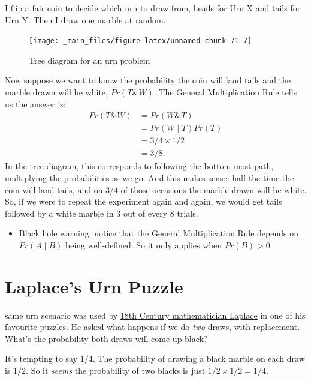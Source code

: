 \documentclass[justified]{tufte-book}
\newcommand{\given}{\mid}
\renewcommand{\wedge}{\mathbin{\&}}
\newcommand{\gt}{>}
\newcommand{\p}{Pr}
\newenvironment{warning}{\begin{itemize}\item[\faBan]}{\end{itemize}}
\theoremstyle{definition}
\theoremstyle{definition}
\theoremstyle{definition}
\theoremstyle{remark}
\begin{document}
I flip a fair coin to decide which urn to draw from, heads for Urn X and
tails for Urn Y. Then I draw one marble at random.

\begin{figure}
\texttt{[image: \_main\_files/figure-latex/unnamed-chunk-71-7]} \caption[Tree diagram for an urn problem]{Tree diagram for an urn problem}\label{fig:unnamed-chunk-71}
\end{figure}

Now suppose we want to know the probability the coin will land tails and
the marble drawn will be white, \(\p(T \wedge W)\). The General
Multiplication Rule tells us the answer is: \[
  \begin{aligned}
    \p(T \wedge W) &= \p(W \wedge T)\\
                   &= \p(W \given T) \p(T)\\
                   &= 3/4 \times 1/2\\
                   &= 3/8.
  \end{aligned}
\] In the tree diagram, this corresponds to following the bottom-most
path, multiplying the probabilities as we go. And this makes sense: half
the time the coin will land tails, and on \(3/4\) of those occasions the
marble drawn will be white. So, if we were to repeat the experiment
again and again, we would get tails followed by a white marble in \(3\)
out of every \(8\) trials.

\begin{warning}
Black hole warning: notice that the General Multiplication Rule depends
on \(\p(A \given B)\) being well-defined. So it only applies when
\(\p(B) \gt 0\).
\end{warning}

\hypertarget{laplaces-urn-puzzle}{%
\section{Laplace's Urn Puzzle}\label{laplaces-urn-puzzle}}

 same urn scenario was used by
\protect\hyperlink{strength}{18th Century mathematician Laplace} in one
of his favourite puzzles. He asked what happens if we do \emph{two}
draws, with replacement. What's the probability both draws will come up
black?

It's tempting to say \(1/4\). The probability of drawing a black marble
on each draw is \(1/2\). So it \emph{seems} the probability of two
blacks is just \(1/2 \times 1/2 = 1/4\).
\end{document}
